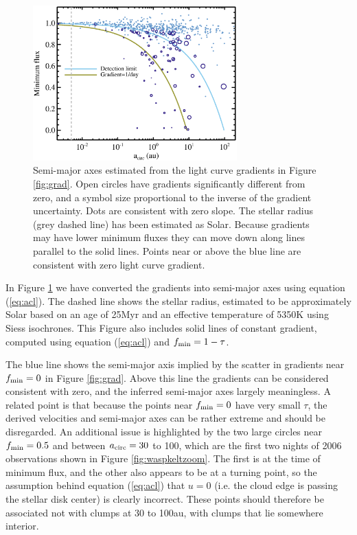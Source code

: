 \documentclass[]{rsos}
\begin{document}
\begin{figure}
  \begin{center}
    \hspace{-0.5cm} \includegraphics[width=0.7\textwidth]{figs/sma.eps}
    \caption{Semi-major axes estimated from the light curve gradients in Figure
      \ref{fig:grad}. Open circles have gradients significantly different from zero, and
      a symbol size proportional to the inverse of the gradient uncertainty. Dots are
      consistent with zero slope. The stellar radius (grey dashed line) has been
      estimated as Solar. Because gradients may have lower minimum fluxes they can move
      down along lines parallel to the solid lines. Points near or above the blue line
      are consistent with zero light curve gradient.}\label{fig:sma}
  \end{center}
\end{figure}

In Figure \ref{fig:sma} we have converted the gradients into semi-major axes using
equation (\ref{eq:acl}). The dashed line shows the stellar radius, estimated to be
approximately Solar based on an age of 25Myr \cite{2013AstL...39..776P} and an effective
temperature of 5350K \cite{2014A&A...563A.139P} using Siess \cite{2000A&A...358..593S}
isochrones. This Figure also includes solid lines of constant gradient, computed using
equation (\ref{eq:acl}) and $f_{\rm min} = 1-\tau$.

The blue line shows the semi-major axis implied by the scatter in gradients near
$f_{\rm min}=0$ in Figure \ref{fig:grad}. Above this line the gradients can be considered
consistent with zero, and the inferred semi-major axes largely meaningless. A related
point is that because the points near $f_{\rm min}=0$ have very small $\tau$, the derived
velocities and semi-major axes can be rather extreme and should be disregarded. An
additional issue is highlighted by the two large circles near $f_{\rm min}=0.5$ and
between $a_{\rm circ}=30$ to 100, which are the first two nights of 2006 observations
shown in Figure \ref{fig:waspkeltzoom}. The first is at the time of minimum flux, and the
other also appears to be at a turning point, so the assumption behind equation
(\ref{eq:acl}) that $u=0$ (i.e. the cloud edge is passing the stellar disk center) is
clearly incorrect. These points should therefore be associated not with clumps at 30 to
100au, with clumps that lie somewhere interior.
\end{document}
